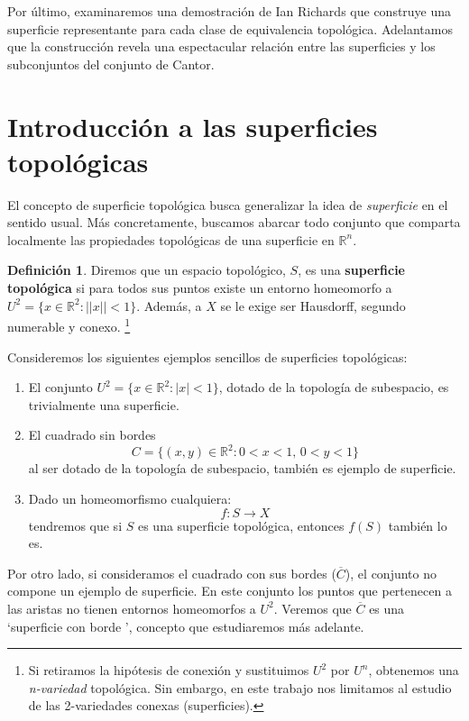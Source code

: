 \documentclass[a4paper,11pt,spanish, twoside, leqno]{tfg-uam}
\theoremstyle{definition}
\newtheorem{defin}[teor]{Definici\'on}
\begin{document}
  Por último, examinaremos una demostración de Ian Richards \cite{ian} que  construye una superficie representante para cada clase de equivalencia topológica. Adelantamos que la construcción revela una espectacular relación entre las superficies y los subconjuntos del conjunto de Cantor.

\section{Introducci\'on a las superficies topológicas}


El concepto de superficie topológica busca generalizar la idea de \textit{superficie} en el sentido usual. Más concretamente, buscamos abarcar todo conjunto que comparta localmente las propiedades topológicas de una superficie en $\mathbb{R}^n$. 

\begin{defin}
	Diremos que un espacio topológico, $S$, es una \textbf{superficie topológica} si para todos sus puntos existe un entorno homeomorfo a $U^2 = \{x\in \mathbb{R}^2: ||x||<1 \}$. Además, a $X$ se le exige ser Hausdorff, segundo numerable y conexo. \footnote{Si retiramos la hipótesis de conexión y sustituimos $U^2$ por $U^n$, obtenemos una \textit{n-variedad} topológica. Sin embargo, en este trabajo nos limitamos al estudio de las 2-variedades conexas (superficies).}
\end{defin}

Consideremos los siguientes ejemplos sencillos de superficies topológicas:
\begin{enumerate}
	\item El conjunto $ U^2 = \{ x\in\mathbb{R}^2: |x|<1 \} $, dotado de la topología de subespacio, es trivialmente una superficie. 
	\item El cuadrado sin bordes
	\[
	C = \{(x,y)\in \mathbb{R}^2: 0 <  x < 1,\, 0 < y < 1 \}
	\]
	al ser dotado de la topología de subespacio, también es ejemplo de superficie.
	\item Dado un homeomorfismo cualquiera:
	\[
	f:S \rightarrow X
	\]
	tendremos que si $S$ es una superficie topológica, entonces $f(S)$ también lo es.
\end{enumerate}

Por otro lado, si consideramos el cuadrado con sus bordes ($\overline{C}$), el conjunto no compone un ejemplo de superficie. En este conjunto los puntos que pertenecen a las aristas no tienen entornos homeomorfos a $U^2$. Veremos que $\overline{C}$ es una \textquoteleft superficie con borde \textquoteright, concepto que estudiaremos más adelante.
\end{document}
